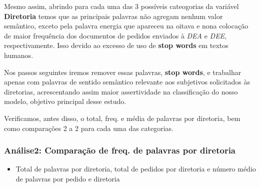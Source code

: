 \documentclass[]{article}
\newenvironment{Shaded}{\begin{snugshade}}{\end{snugshade}}
\newcommand{\KeywordTok}[1]{\textcolor[rgb]{0.13,0.29,0.53}{\textbf{#1}}}
\newcommand{\DataTypeTok}[1]{\textcolor[rgb]{0.13,0.29,0.53}{#1}}
\newcommand{\StringTok}[1]{\textcolor[rgb]{0.31,0.60,0.02}{#1}}
\newcommand{\OperatorTok}[1]{\textcolor[rgb]{0.81,0.36,0.00}{\textbf{#1}}}
\newcommand{\NormalTok}[1]{#1}
\providecommand{\tightlist}{%
  \setlength{\itemsep}{0pt}\setlength{\parskip}{0pt}}
\begin{document}
Mesmo assim, abrindo para cada uma das 3 possíveis cateogorias da
variável \textbf{Diretoria} temos que as principais palavras não agregam
nenhum valor semântico, exceto pela palavra energia que apareceu na
oitava e nona colocação de maior frequência dos documentos de pedidos
enviados à \emph{DEA} e \emph{DEE}, respectivamente. Isso devido ao
excesso de uso de \textbf{stop words} em textos humanos.

Nos passos seguintes iremos remover essas palavras, \textbf{stop words},
e trabalhar apenas com palavras de sentido semântico relevante aos
subjetivos solicitados às diretorias, acrescentando assim maior
assertividade na classificação do nosso modelo, objetivo principal desse
estudo.

Verificamos, antes disso, o total, freq. e média de palavras por
diretoria, bem como comparações 2 a 2 para cada uma das categorias.

\subsubsection{Análise2: Comparação de freq. de palavras por
diretoria}\label{analise2-comparacao-de-freq.-de-palavras-por-diretoria}

\begin{itemize}
\tightlist
\item
  Total de palavras por diretoria, total de pedidos por diretoria e
  número médio de palavras por pedido e diretoria
\end{itemize}

\begin{Shaded}
\end{Shaded}
\end{document}
